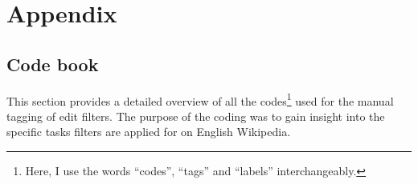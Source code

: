 %

\chapter{Appendix}
\label{ch:Appendix}

\section{Code book}
\label{app:code_book}

This section provides a detailed overview of all the codes\footnote{Here, I use the words ``codes'', ``tags'' and ``labels'' interchangeably.} used for the manual tagging of edit filters.
The purpose of the coding was to gain insight into the specific tasks filters are applied for on English Wikipedia.


